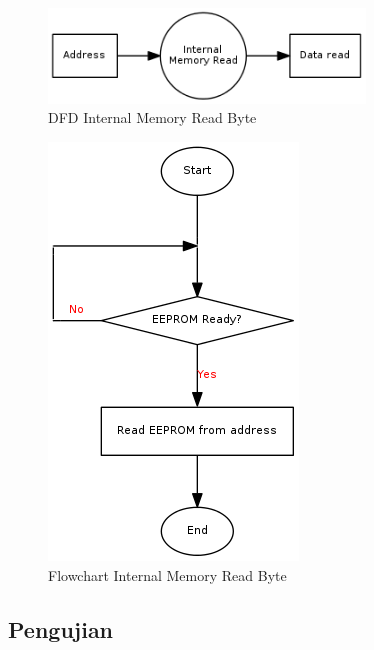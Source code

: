 \begin{figure}[!h]
\centering
\includegraphics[width=0.75\textwidth]{image/hal/dfd_internalreadbyte.png}
\caption{DFD Internal Memory Read Byte}
\label{fig-dfd-internalreadbyte}
\end{figure}

\begin{figure}[!h]
\centering
\includegraphics[height=0.4\textheight]{image/hal/flow_internalreadbyte.png}
\caption{Flowchart Internal Memory Read Byte}
\label{fig-flow-internalreadbyte}
\end{figure}

\subsection {Pengujian}

